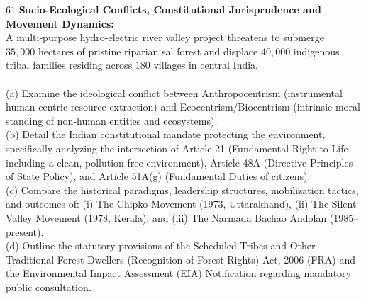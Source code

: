 \begin{subjectiveq}{6}{1}
\textbf{Socio-Ecological Conflicts, Constitutional Jurisprudence and Movement Dynamics:}\\A multi-purpose hydro-electric river valley project threatens to submerge $35{,}000\text{ hectares}$ of pristine riparian sal forest and displace $40{,}000$ indigenous tribal families residing across $180$ villages in central India.\\\\(a) Examine the ideological conflict between Anthropocentrism (instrumental human-centric resource extraction) and Ecocentrism/Biocentrism (intrinsic moral standing of non-human entities and ecosystems).\\(b) Detail the Indian constitutional mandate protecting the environment, specifically analyzing the intersection of Article 21 (Fundamental Right to Life including a clean, pollution-free environment), Article 48A (Directive Principles of State Policy), and Article 51A(g) (Fundamental Duties of citizens).\\(c) Compare the historical paradigms, leadership structures, mobilization tactics, and outcomes of: (i) The Chipko Movement (1973, Uttarakhand), (ii) The Silent Valley Movement (1978, Kerala), and (iii) The Narmada Bachao Andolan (1985--present).\\(d) Outline the statutory provisions of the Scheduled Tribes and Other Traditional Forest Dwellers (Recognition of Forest Rights) Act, 2006 (FRA) and the Environmental Impact Assessment (EIA) Notification regarding mandatory public consultation.
\end{subjectiveq}

